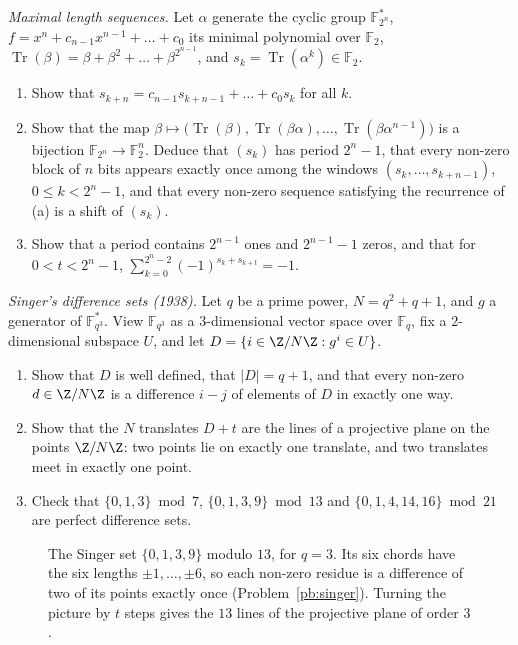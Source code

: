 \begin{exercise}[$\star\star$]\label{pb:mseq}
\emph{Maximal length sequences.} Let $\alpha$ generate the cyclic group $\mathbb F_{2^n}^*$, $f=x^n+c_{n-1}x^{n-1}+\dots+c_0$ its
minimal polynomial over $\mathbb F_2$, $\operatorname{Tr}(\beta)=\beta+\beta^2+\dots+\beta^{2^{n-1}}$, and
$s_k=\operatorname{Tr}(\alpha^k)\in\mathbb F_2$.
\begin{enumerate}[label=(\alph*)]
\item Show that $s_{k+n}=c_{n-1}s_{k+n-1}+\dots+c_0s_k$ for all $k$.
\item Show that the map $\beta\mapsto\bigl(\operatorname{Tr}(\beta),\operatorname{Tr}(\beta\alpha),\dots,\operatorname{Tr}(\beta\alpha^{n-1})\bigr)$ is a bijection
$\mathbb F_{2^n}\to\mathbb F_2^n$. Deduce that $(s_k)$ has period $2^n-1$, that every non-zero block of $n$ bits appears exactly
once among the windows $(s_k,\dots,s_{k+n-1})$, $0\le k<2^n-1$, and that every non-zero sequence satisfying the recurrence of (a)
is a shift of $(s_k)$.
\item Show that a period contains $2^{n-1}$ ones and $2^{n-1}-1$ zeros, and that for $0<t<2^n-1$,
$\sum_{k=0}^{2^n-2}(-1)^{s_k+s_{k+t}}=-1$.
\end{enumerate}
\end{exercise}

\begin{exercise}[$\star\star\star$]\label{pb:singer}
\emph{Singer's difference sets (1938).} Let $q$ be a prime power, $N=q^2+q+1$, and $g$ a generator of $\mathbb F_{q^3}^*$. View
$\mathbb F_{q^3}$ as a $3$-dimensional vector space over $\mathbb F_q$, fix a $2$-dimensional subspace $U$, and let
$D=\{i\in\Z/N\Z:g^i\in U\}$.
\begin{enumerate}[label=(\alph*)]
\item Show that $D$ is well defined, that $|D|=q+1$, and that every non-zero $d\in\Z/N\Z$ is a difference $i-j$ of elements of
$D$ in exactly one way.
\item Show that the $N$ translates $D+t$ are the lines of a projective plane on the points $\Z/N\Z$: two points lie on exactly one
translate, and two translates meet in exactly one point.
\item Check that $\{0,1,3\}\bmod7$, $\{0,1,3,9\}\bmod13$ and $\{0,1,4,14,16\}\bmod21$ are perfect difference sets.
\end{enumerate}
\end{exercise}

\begin{figure}[ht]
\centering
{}
\caption{The Singer set $\{0,1,3,9\}$ modulo $13$, for $q=3$. Its six chords have the six lengths $\pm1,\dots,\pm6$, so each
non-zero residue is a difference of two of its points exactly once (Problem~\ref{pb:singer}). Turning the picture by $t$ steps
gives the $13$ lines of the projective plane of order $3$.}
\label{fig:singer}
\end{figure}


